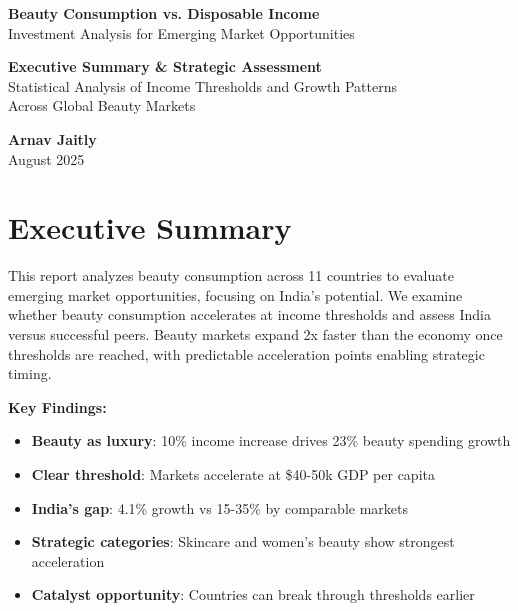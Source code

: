 \documentclass[11pt]{article}
\begin{document}
\begin{titlepage}
\centering
\vspace*{2cm}

{\Huge\bfseries Beauty Consumption vs. Disposable Income}\\[0.5cm]
{\Large Investment Analysis for Emerging Market Opportunities}\\[1.5cm]

\vspace{2cm}

{\large
\textbf{Executive Summary \& Strategic Assessment}\\[0.3cm]
Statistical Analysis of Income Thresholds and Growth Patterns\\[0.3cm]
Across Global Beauty Markets
}

\vspace{3cm}

{\Large
\textbf{Arnav Jaitly}\\[0.5cm]
August 2025
}

\vfill

\end{titlepage}

\newpage

\section*{Executive Summary}

This report analyzes beauty consumption across 11 countries to evaluate emerging market opportunities, focusing on India's potential. We examine whether beauty consumption accelerates at income thresholds and assess India versus successful peers. Beauty markets expand 2x faster than the economy once thresholds are reached, with predictable acceleration points enabling strategic timing.

\textbf{Key Findings:}
\vspace{-5pt}
\begin{itemize}
    \setlength{\itemsep}{-2pt}
    \item \textbf{Beauty as luxury}: 10\% income increase drives 23\% beauty spending growth
    \item \textbf{Clear threshold}: Markets accelerate at \$40-50k GDP per capita
    \item \textbf{India's gap}: 4.1\% growth vs 15-35\% by comparable markets
    \item \textbf{Strategic categories}: Skincare and women's beauty show strongest acceleration
    \item \textbf{Catalyst opportunity}: Countries can break through thresholds earlier
\end{itemize}
\end{document}
